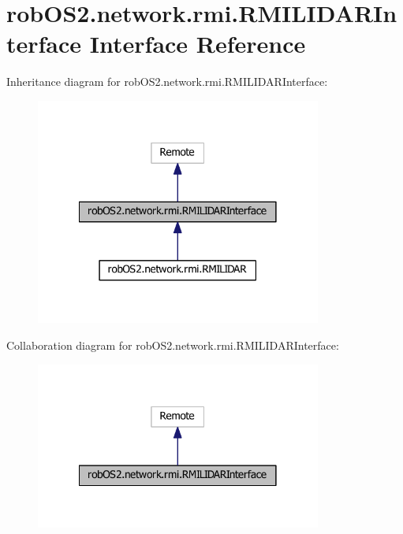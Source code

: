 \hypertarget{interfacerob_o_s2_1_1network_1_1rmi_1_1_r_m_i_l_i_d_a_r_interface}{
\section{robOS2.network.rmi.RMILIDARInterface Interface Reference}
\label{interfacerob_o_s2_1_1network_1_1rmi_1_1_r_m_i_l_i_d_a_r_interface}
}


Inheritance diagram for robOS2.network.rmi.RMILIDARInterface:
\nopagebreak
\begin{figure}[H]
\begin{center}
\leavevmode
\includegraphics[width=266pt]{interfacerob_o_s2_1_1network_1_1rmi_1_1_r_m_i_l_i_d_a_r_interface__inherit__graph}
\end{center}
\end{figure}


Collaboration diagram for robOS2.network.rmi.RMILIDARInterface:
\nopagebreak
\begin{figure}[H]
\begin{center}
\leavevmode
\includegraphics[width=266pt]{interfacerob_o_s2_1_1network_1_1rmi_1_1_r_m_i_l_i_d_a_r_interface__coll__graph}
\end{center}
\end{figure}

